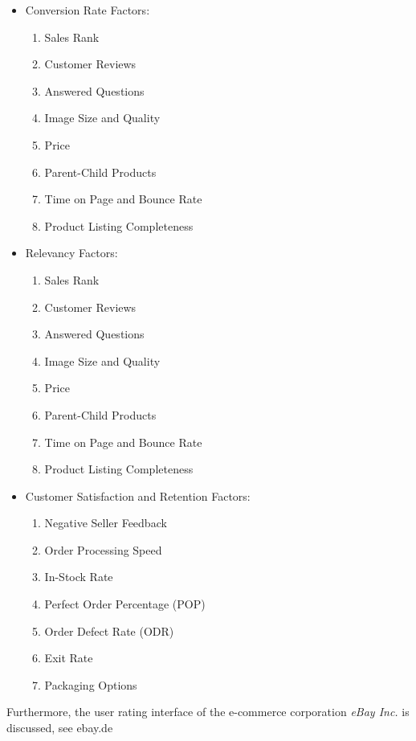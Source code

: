 \begin{itemize}
   \item Conversion Rate Factors:
   \begin{enumerate}
		\item Sales Rank
		\item Customer Reviews
		\item Answered Questions
		\item Image Size and Quality
		\item Price
		\item Parent-Child Products
		\item Time on Page and Bounce Rate
		\item Product Listing Completeness
   \end{enumerate}
   \item Relevancy Factors:
   \begin{enumerate}
		\item Sales Rank
		\item Customer Reviews
		\item Answered Questions
		\item Image Size and Quality
		\item Price
		\item Parent-Child Products
		\item Time on Page and Bounce Rate
		\item Product Listing Completeness
   \end{enumerate}
   \item Customer Satisfaction and Retention Factors:
   \begin{enumerate}
		\item Negative Seller Feedback
		\item Order Processing Speed
		\item In-Stock Rate
		\item Perfect Order Percentage (POP)
		\item Order Defect Rate (ODR)
		\item Exit Rate
		\item Packaging Options
   \end{enumerate}
\end{itemize}

Furthermore, the user rating interface of the e-commerce corporation {\emph{eBay Inc.}} is discussed, see {ebay.de}\\ 

